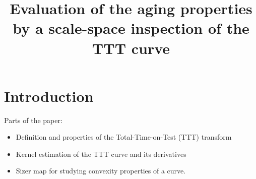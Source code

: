 \documentclass[preprint,12pt]{elsarticle}
\begin{document}
\begin{frontmatter}%

\title{Evaluation of the aging properties by a scale-space inspection of the TTT curve}
%
%  







\begin{abstract}

\end{abstract}

\begin{keyword}

\end{keyword}
\end{frontmatter}
\bigskip

\section{Introduction}
Parts of the paper:
\begin{itemize}
\item Definition and properties of the Total-Time-on-Test (TTT) transform
\item Kernel estimation of the TTT curve and its derivatives
\item Sizer map for studying convexity properties of a curve.
\end{itemize}
\end{document}
